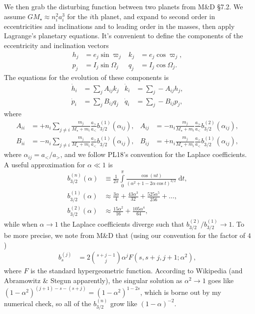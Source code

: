 \documentclass[11pt,
        usenames, %
        dvipsnames %
    ]{article}
\newcommand*{\p}[1]{\left(#1\right)}
\begin{document}
We then grab the disturbing function between two planets from M\&D \S7.2. We
assume $GM_\star \approx n_i^2a_i^3$ for the $i$th planet, and expand to second
order in eccentricities and inclinations and to leading order in the masses,
then apply Lagrange's planetary equations. It's convenient to define the
components of the eccentricity and inclination vectors
\begin{align}
    h_j &= e_j \sin \varpi_j & k_j &= e_j \cos \varpi_j,\\
    p_j &= I_j \sin \Omega_j & q_j &= I_j \cos \Omega_j.
\end{align}
The equations for the evolution of these components is
\begin{align}
    \dot{h}_i &= \sum\limits_{j} A_{ij}k_j &
    \dot{k}_i &= \sum\limits_j -A_{ij}h_j,\\
    \dot{p}_i &= \sum\limits_j B_{ij}q_j &
    \dot{q}_i &= \sum\limits_j -B_{ij}p_j,
\end{align}
where
\begin{align}
    A_{ii} &= +n_i \sum\limits_{j \neq i}\frac{m_j}{M_\star + m_i}
        \frac{a_>}{a_<} b_{3/2}^{(1)}\p{\alpha_{ij}},&
    A_{ij} &= -n_i \frac{m_j}{M_\star + m_i}
        \frac{a_>}{a_<} b_{3/2}^{(2)}\p{\alpha_{ij}},\\
    B_{ii} &= -n_i\sum\limits_{j \neq i} \frac{m_j}{M_\star + m_i}
        \frac{a_>}{a_<} b_{3/2}^{(1)}\p{\alpha_{ij}},&
    B_{ij} &= +n_i \frac{m_j}{M_\star + m_i}
        \frac{a_>}{a_<} b_{3/2}^{(1)}\p{\alpha_{ij}},
\end{align}
where $\alpha_{ij} = a_< / a_>$, and we follow PL18's convention for the Laplace
coefficients. A useful approximation for $\alpha \ll 1$ is
\begin{align}
    b_{3/2}^{(n)}(\alpha) &\equiv \frac{1}{2\pi}\int\limits_0^\pi
        \frac{\cos (nt)}{(\alpha^2 + 1 - 2\alpha \cos t)^{3/2}}\;\mathrm{d}t,\\
    b_{3/2}^{(1)}(\alpha) &\approx \frac{3\alpha}{4} + \frac{43\alpha^3}{32}
        + \frac{525\alpha^5}{256} + \dots,\\
    b_{3/2}^{(2)}(\alpha) &\approx \frac{15\alpha^2}{16} +
        \frac{105\alpha^4}{64},
\end{align}
while when $\alpha \to 1$ the Laplace coefficients diverge such that $
b_{3/2}^{(2)} / b_{3/2}^{(1)} \to 1$. To be more precise, we note from M\&D that
(using our convention for the factor of $4$)
\begin{align}
    b_s^{(j)} &= 2\binom{s + j - 1}{j} \alpha^j F\p{s,s+j,j+1;\alpha^2},
\end{align}
where $F$ is the standard hypergeometric function. According to Wikipedia (and
Abramowitz \& Stegun apparently), the singular solution as $\alpha^2 \to 1$ goes
like $\p{1 - \alpha^2}^{(j + 1) - s - (s + j)} = \p{1 - \alpha^2}^{1 - 2s}$,
which is borne out by my numerical check, so all of the $b_{3/2}^{(n)}$ grow
like $\p{1 - \alpha}^{-2}$.
\end{document}
